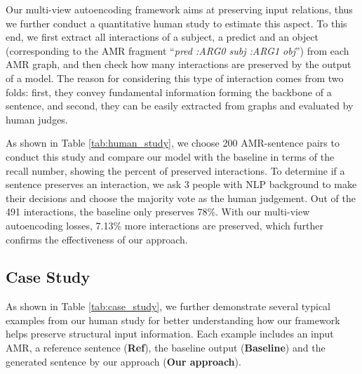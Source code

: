 \documentclass[11pt,a4paper]{article}
\begin{document}
Our multi-view autoencoding framework aims at preserving input relations, thus we further conduct a quantitative human study to estimate this aspect.
To this end, we first extract all interactions of a subject, a predict and an object (corresponding to the AMR fragment ``\emph{pred :ARG0 subj :ARG1 obj}'') from each AMR graph, and then check how many interactions are preserved by the output of a model.
The reason for considering this type of interaction comes from two folds: first, they convey fundamental information forming the backbone of a sentence, and second, 
they can be easily extracted from graphs and evaluated by human judges.


As shown in Table \ref{tab:human_study}, we choose 200 AMR-sentence pairs to conduct this study and compare our model with the baseline in terms of the recall number, showing the percent of preserved interactions.
To determine if a sentence preserves an interaction, we ask 3 people with NLP background to make their decisions and choose the majority vote as the human judgement.
Out of the 491 interactions, the baseline only preserves 78\%.
With our multi-view autoencoding losses, 7.13\% more interactions are preserved, which further confirms the effectiveness of our approach.


\subsection{Case Study}


As shown in Table \ref{tab:case_study}, we further demonstrate several typical examples from our human study for better understanding how our framework helps preserve structural input information.
Each example includes an input AMR, a reference sentence (\textbf{Ref}), the baseline output (\textbf{Baseline}) and the generated sentence by our approach (\textbf{Our approach}).
\end{document}
